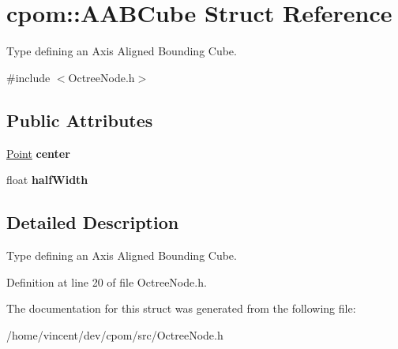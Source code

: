 \hypertarget{structcpom_1_1_a_a_b_cube}{}\section{cpom\+:\+:A\+A\+B\+Cube Struct Reference}
\label{structcpom_1_1_a_a_b_cube}


Type defining an Axis Aligned Bounding Cube.  




{\ttfamily \#include $<$Octree\+Node.\+h$>$}

\subsection*{Public Attributes}
\begin{DoxyCompactItemize}
\item 
\hyperlink{structcpom_1_1_float3}{Point} {\bfseries center}\hypertarget{structcpom_1_1_a_a_b_cube_a2f9cc0d64f52bb136bb4642baa631f72}{}\label{structcpom_1_1_a_a_b_cube_a2f9cc0d64f52bb136bb4642baa631f72}

\item 
float {\bfseries half\+Width}\hypertarget{structcpom_1_1_a_a_b_cube_a3c57a9f146863be00e461bc47020fce2}{}\label{structcpom_1_1_a_a_b_cube_a3c57a9f146863be00e461bc47020fce2}

\end{DoxyCompactItemize}


\subsection{Detailed Description}
Type defining an Axis Aligned Bounding Cube. 

Definition at line 20 of file Octree\+Node.\+h.



The documentation for this struct was generated from the following file\+:\begin{DoxyCompactItemize}
\item 
/home/vincent/dev/cpom/src/Octree\+Node.\+h\end{DoxyCompactItemize}
